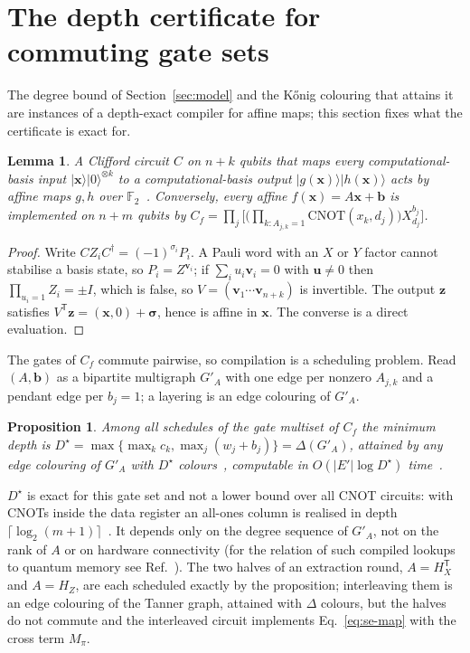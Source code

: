 \documentclass[reprint,twocolumn,superscriptaddress,nofootinbib]{revtex4-2}
\theoremstyle{plain}
\newtheorem*{lemmaSI}{Lemma}
\newtheorem*{propSI}{Proposition}
\newcommand{\F}{\mathbb{F}_2}
\begin{document}
\section{The depth certificate for commuting gate sets}
\label{si:compiler}

The degree bound of Section~\ref{sec:model} and the K\H{o}nig colouring
that attains it are instances of a depth-exact compiler for affine maps;
this section fixes what the certificate is exact for.

\begin{lemmaSI}
A Clifford circuit $C$ on $n+k$ qubits that maps every computational-basis
input $|\mathbf{x}\rangle|0\rangle^{\otimes k}$ to a computational-basis
output $|g(\mathbf{x})\rangle|h(\mathbf{x})\rangle$ acts by affine maps
$g,h$ over $\F$~\cite{DehaeneDeMoor2003,Gottesman1998,Aaronson2004}.
Conversely, every affine $f(\mathbf{x})=A\mathbf{x}+\mathbf{b}$ is
implemented on $n+m$ qubits by
$C_f=\prod_j\bigl[\bigl(\prod_{k:A_{j,k}=1}\mathrm{CNOT}(x_k,d_j)\bigr)
X_{d_j}^{b_j}\bigr]$.
\end{lemmaSI}

\begin{proof}
Write $CZ_iC^\dagger=(-1)^{\sigma_i}P_i$. A Pauli word with an $X$ or $Y$
factor cannot stabilise a basis state, so $P_i=Z^{\mathbf{v}_i}$; if
$\sum_iu_i\mathbf{v}_i=0$ with $\mathbf{u}\neq0$ then
$\prod_{u_i=1}Z_i=\pm I$, which is false, so
$V=(\mathbf{v}_1\cdots\mathbf{v}_{n+k})$ is invertible. The output
$\mathbf{z}$ satisfies $V^{\mathsf T}\mathbf{z}=(\mathbf{x},0)+\bm{\sigma}$,
hence is affine in $\mathbf{x}$. The converse is a direct evaluation.
\end{proof}

The gates of $C_f$ commute pairwise, so compilation is a scheduling
problem. Read $(A,\mathbf{b})$ as a bipartite multigraph $G'_A$ with one
edge per nonzero $A_{j,k}$ and a pendant edge per $b_j=1$; a layering is an
edge colouring of $G'_A$.

\begin{propSI}
Among all schedules of the gate multiset of $C_f$ the minimum depth is
$D^\star=\max\{\max_kc_k,\max_j(w_j+b_j)\}=\Delta(G'_A)$, attained by any
edge colouring of $G'_A$ with $D^\star$ colours~\cite{Konig1916}, computable
in $O(|E'|\log D^\star)$ time~\cite{ColeOstSchirra2001,GabowKariv1982}.
\end{propSI}

$D^\star$ is exact for this gate set and not a lower bound over all CNOT
circuits: with CNOTs inside the data register an all-ones column is
realised in depth $\lceil\log_2(m+1)\rceil$~\cite{MooreNilsson2001,
Jiang2020,MaslovZindorf2022,deBrugiere2021}. It depends only on the
degree sequence of $G'_A$, not on the rank of $A$ or on hardware
connectivity (for the relation of such compiled lookups to quantum memory
see Ref.~\cite{Jaques2023}). The two halves of an extraction round, $A=H_X^{\mathsf T}$ and $A=H_Z$, are
each scheduled exactly by the proposition; interleaving them is an edge
colouring of the Tanner graph, attained with $\Delta$ colours, but the
halves do not commute and the interleaved circuit implements
Eq.~\eqref{eq:se-map} with the cross term $M_\pi$.
\end{document}

